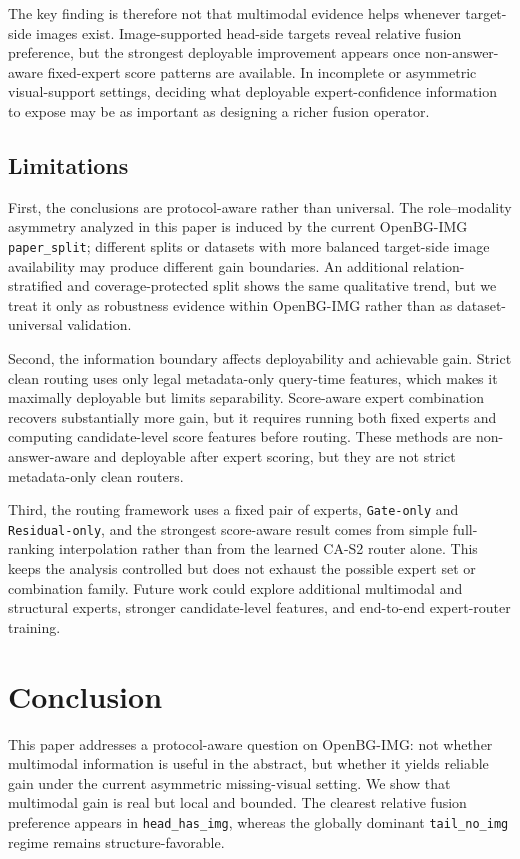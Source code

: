 \documentclass[11pt]{article}
\begin{document}
The key finding is therefore not that multimodal evidence helps whenever target-side images exist. Image-supported head-side targets reveal relative fusion preference, but the strongest deployable improvement appears once non-answer-aware fixed-expert score patterns are available. In incomplete or asymmetric visual-support settings, deciding what deployable expert-confidence information to expose may be as important as designing a richer fusion operator.

\subsection{Limitations}

First, the conclusions are protocol-aware rather than universal. The role--modality asymmetry analyzed in this paper is induced by the current OpenBG-IMG \texttt{paper\_split}; different splits or datasets with more balanced target-side image availability may produce different gain boundaries. An additional relation-stratified and coverage-protected split shows the same qualitative trend, but we treat it only as robustness evidence within OpenBG-IMG rather than as dataset-universal validation.

Second, the information boundary affects deployability and achievable gain. Strict clean routing uses only legal metadata-only query-time features, which makes it maximally deployable but limits separability. Score-aware expert combination recovers substantially more gain, but it requires running both fixed experts and computing candidate-level score features before routing. These methods are non-answer-aware and deployable after expert scoring, but they are not strict metadata-only clean routers.

Third, the routing framework uses a fixed pair of experts, \texttt{Gate-only} and \texttt{Residual-only}, and the strongest score-aware result comes from simple full-ranking interpolation rather than from the learned CA-S2 router alone. This keeps the analysis controlled but does not exhaust the possible expert set or combination family. Future work could explore additional multimodal and structural experts, stronger candidate-level features, and end-to-end expert-router training.

\section{Conclusion}
This paper addresses a protocol-aware question on OpenBG-IMG: not whether multimodal information is useful in the abstract, but whether it yields reliable gain under the current asymmetric missing-visual setting. We show that multimodal gain is real but local and bounded. The clearest relative fusion preference appears in \texttt{head\_has\_img}, whereas the globally dominant \texttt{tail\_no\_img} regime remains structure-favorable.
\end{document}
